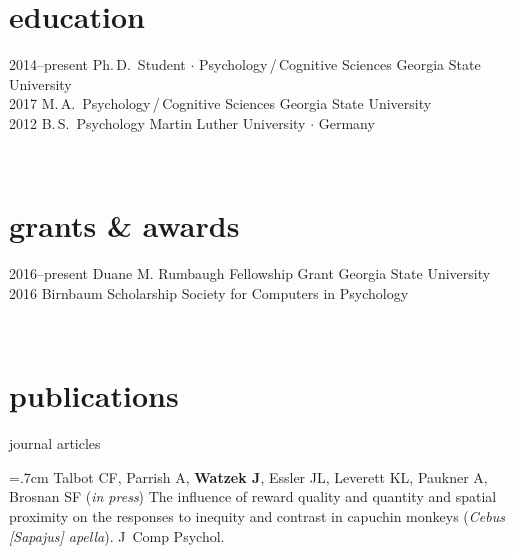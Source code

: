 \documentclass[]{friggeri-cv}
\begin{document}
\section{education}

\begin{entrylist}
  \entry
    {2014--present}
    {Ph.\,D.~Student $\cdot$ Psychology\,/\,Cognitive Sciences}
    {Georgia State University}
    {\\[-.7cm]}
 \entry
   {2017}
   {M.\,A.~Psychology\,/\,Cognitive Sciences}
   {Georgia State University}
   {\\[-.7cm]}
  \entry
    {2012}
    {B.\,S.~Psychology}
    {Martin Luther University $\cdot$ Germany}
    {}
\end{entrylist}\\[-.1cm]


\section{grants \& awards}

\begin{entrylist}
  \entry
    {2016--present}
    {Duane M. Rumbaugh Fellowship Grant}
    {Georgia State University}
    {\\[-.75cm]}
  \entry
    {2016}
    {Birnbaum Scholarship}
    {Society for Computers in Psychology}
    {}
\end{entrylist}\\[-.1cm]


\section{publications}


{\subfont\large{} journal articles}

\hangindent=.7cm Talbot CF, Parrish A, \textbf{Watzek J}, Essler JL, Leverett KL, Paukner A, Brosnan SF (\emph{in press}) The influence of reward quality and quantity and spatial proximity on the responses to inequity and contrast in capuchin monkeys (\emph{Cebus [Sapajus] apella}). J~Comp Psychol.
\end{document}
